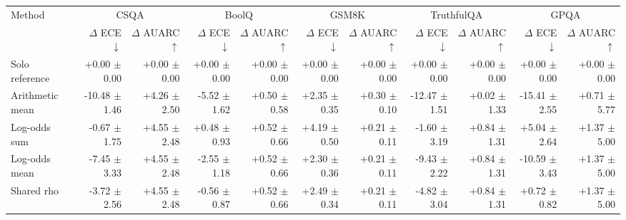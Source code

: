\begin{tabular}{lrrrrrrrrrr}
\toprule
Method & \multicolumn{2}{c}{CSQA} & \multicolumn{2}{c}{BoolQ} & \multicolumn{2}{c}{GSM8K} & \multicolumn{2}{c}{TruthfulQA} & \multicolumn{2}{c}{GPQA} \\
 & $\Delta$ ECE $\downarrow$ & $\Delta$ AUARC $\uparrow$ & $\Delta$ ECE $\downarrow$ & $\Delta$ AUARC $\uparrow$ & $\Delta$ ECE $\downarrow$ & $\Delta$ AUARC $\uparrow$ & $\Delta$ ECE $\downarrow$ & $\Delta$ AUARC $\uparrow$ & $\Delta$ ECE $\downarrow$ & $\Delta$ AUARC $\uparrow$ \\
\midrule
Solo reference & +0.00 {\scriptsize $\pm$ 0.00} & +0.00 {\scriptsize $\pm$ 0.00} & +0.00 {\scriptsize $\pm$ 0.00} & +0.00 {\scriptsize $\pm$ 0.00} & +0.00 {\scriptsize $\pm$ 0.00} & +0.00 {\scriptsize $\pm$ 0.00} & +0.00 {\scriptsize $\pm$ 0.00} & +0.00 {\scriptsize $\pm$ 0.00} & +0.00 {\scriptsize $\pm$ 0.00} & +0.00 {\scriptsize $\pm$ 0.00} \\
Arithmetic mean & -10.48 {\scriptsize $\pm$ 1.46} & +4.26 {\scriptsize $\pm$ 2.50} & -5.52 {\scriptsize $\pm$ 1.62} & +0.50 {\scriptsize $\pm$ 0.58} & +2.35 {\scriptsize $\pm$ 0.35} & +0.30 {\scriptsize $\pm$ 0.10} & -12.47 {\scriptsize $\pm$ 1.51} & +0.02 {\scriptsize $\pm$ 1.33} & -15.41 {\scriptsize $\pm$ 2.55} & +0.71 {\scriptsize $\pm$ 5.77} \\
Log-odds sum & -0.67 {\scriptsize $\pm$ 1.75} & +4.55 {\scriptsize $\pm$ 2.48} & +0.48 {\scriptsize $\pm$ 0.93} & +0.52 {\scriptsize $\pm$ 0.66} & +4.19 {\scriptsize $\pm$ 0.50} & +0.21 {\scriptsize $\pm$ 0.11} & -1.60 {\scriptsize $\pm$ 3.19} & +0.84 {\scriptsize $\pm$ 1.31} & +5.04 {\scriptsize $\pm$ 2.64} & +1.37 {\scriptsize $\pm$ 5.00} \\
Log-odds mean & -7.45 {\scriptsize $\pm$ 3.33} & +4.55 {\scriptsize $\pm$ 2.48} & -2.55 {\scriptsize $\pm$ 1.18} & +0.52 {\scriptsize $\pm$ 0.66} & +2.30 {\scriptsize $\pm$ 0.36} & +0.21 {\scriptsize $\pm$ 0.11} & -9.43 {\scriptsize $\pm$ 2.22} & +0.84 {\scriptsize $\pm$ 1.31} & -10.59 {\scriptsize $\pm$ 3.43} & +1.37 {\scriptsize $\pm$ 5.00} \\
Shared rho & -3.72 {\scriptsize $\pm$ 2.56} & +4.55 {\scriptsize $\pm$ 2.48} & -0.56 {\scriptsize $\pm$ 0.87} & +0.52 {\scriptsize $\pm$ 0.66} & +2.49 {\scriptsize $\pm$ 0.34} & +0.21 {\scriptsize $\pm$ 0.11} & -4.82 {\scriptsize $\pm$ 3.04} & +0.84 {\scriptsize $\pm$ 1.31} & +0.72 {\scriptsize $\pm$ 0.82} & +1.37 {\scriptsize $\pm$ 5.00} \\

\end{tabular}
